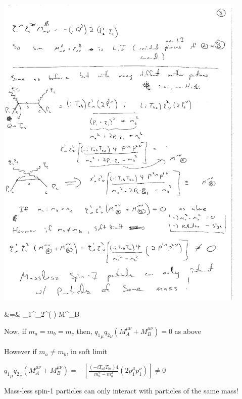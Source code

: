 {\begin{minipage}{0.4\textwidth}
\includegraphics[width=0.9\textwidth]{./comptonScattering4.pdf}
\end{minipage} %
\begin{minipage}{0.45\textwidth}
\bea
&=&  \epsilon_1^\mu \epsilon_2^\nu \left(  \right) \equiv M^{\mu\nu}_B 
\eea
\end{minipage} 

Now, if $m_a = m_b = m_c$ then, $ {q_1}_\mu {q_2}_\nu (M^{\mu\nu}_A + M^{\mu\nu}_B) = 0 $ as above 

However if $m_a \ne m_b$, in soft limit

$ {q_1}_\mu {q_2}_\nu (M^{\mu\nu}_A + M^{\mu\nu}_B) = -\left[ \frac{(-iT_{ab}T_{bc})4}{m_a^2 - m_b^2}  (2 p_1^\mu p_1^\nu) \right] \ne 0$

{\Large Mass-less spin-1 particles can only interact with particles of the same mass!}

\lineacross

\clearpage

}
